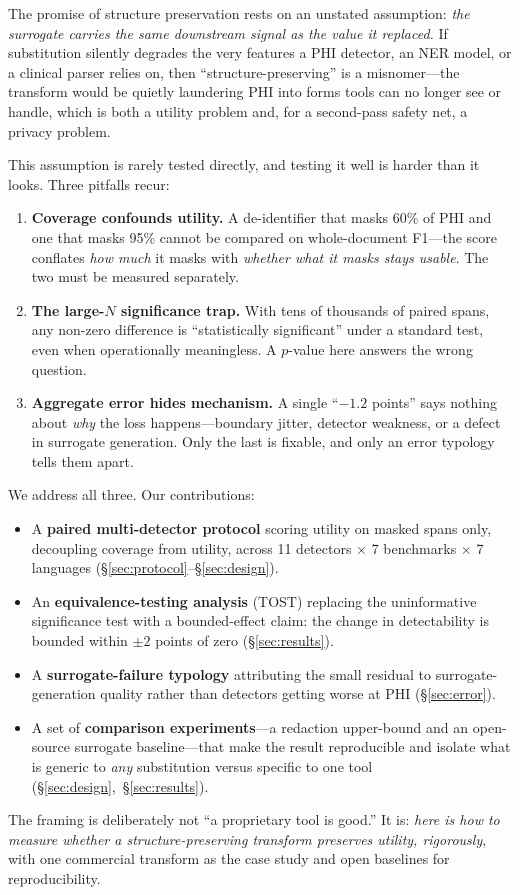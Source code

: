\documentclass[pmlr,twocolumn,10pt]{jmlr}
\begin{document}
The promise of structure preservation rests on an unstated assumption: \emph{the surrogate carries the same downstream signal as the value it replaced.} If substitution silently degrades the very features a PHI detector, an NER model, or a clinical parser relies on, then ``structure-preserving'' is a misnomer---the transform would be quietly laundering PHI into forms tools can no longer see or handle, which is both a utility problem and, for a second-pass safety net, a privacy problem.

This assumption is rarely tested directly, and testing it well is harder than it looks. Three pitfalls recur:
\begin{enumerate}\itemsep2pt
\item \textbf{Coverage confounds utility.} A de-identifier that masks 60\% of PHI and one that masks 95\% cannot be compared on whole-document F1---the score conflates \emph{how much} it masks with \emph{whether what it masks stays usable}. The two must be measured separately.
\item \textbf{The large-$N$ significance trap.} With tens of thousands of paired spans, any non-zero difference is ``statistically significant'' under a standard test, even when operationally meaningless. A $p$-value here answers the wrong question.
\item \textbf{Aggregate error hides mechanism.} A single ``$-1.2$ points'' says nothing about \emph{why} the loss happens---boundary jitter, detector weakness, or a defect in surrogate generation. Only the last is fixable, and only an error typology tells them apart.
\end{enumerate}

We address all three. Our contributions:
\begin{itemize}\itemsep2pt
\item A \textbf{paired multi-detector protocol} scoring utility on masked spans only, decoupling coverage from utility, across 11 detectors $\times$ 7 benchmarks $\times$ 7 languages (\S\ref{sec:protocol}--\S\ref{sec:design}).
\item An \textbf{equivalence-testing analysis} (TOST) replacing the uninformative significance test with a bounded-effect claim: the change in detectability is bounded within $\pm2$ points of zero (\S\ref{sec:results}).
\item A \textbf{surrogate-failure typology} attributing the small residual to surrogate-generation quality rather than detectors getting worse at PHI (\S\ref{sec:error}).
\item A set of \textbf{comparison experiments}---a redaction upper-bound and an open-source surrogate baseline---that make the result reproducible and isolate what is generic to \emph{any} substitution versus specific to one tool (\S\ref{sec:design},~\S\ref{sec:results}).
\end{itemize}
The framing is deliberately not ``a proprietary tool is good.'' It is: \emph{here is how to measure whether a structure-preserving transform preserves utility, rigorously}, with one commercial transform as the case study and open baselines for reproducibility.
\end{document}

